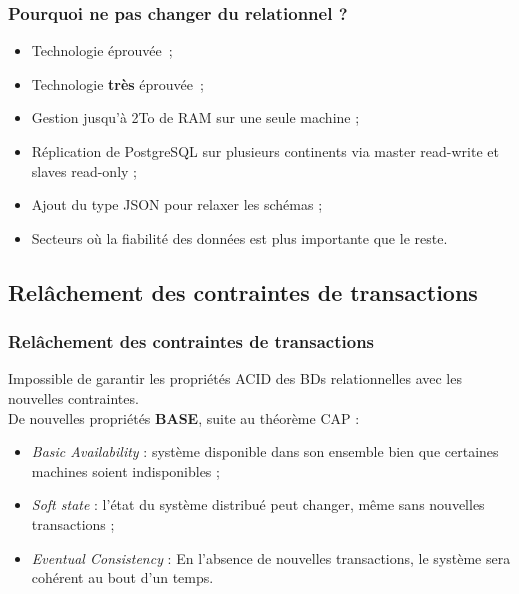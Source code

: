 	\begin{frame}
		\frametitle{Pourquoi ne pas changer du relationnel ?}

		\begin{itemize}
      \item Technologie éprouvée ;
      \item Technologie \textbf{très} éprouvée ;
    \end{itemize}

		\begin{itemize}
			\item Gestion jusqu'à 2To de RAM sur une seule machine ;
			\item Réplication de PostgreSQL sur plusieurs continents via master read-write et slaves read-only ;
			\item Ajout du type JSON pour relaxer les schémas ;
      \item Secteurs où la fiabilité des données est plus importante que le reste.
		\end{itemize}
	\end{frame}

	\subsection{Relâchement des contraintes de transactions}
	\begin{frame}
		\frametitle{Relâchement des contraintes de transactions}

		Impossible de garantir les propriétés ACID des BDs relationnelles avec les nouvelles contraintes.\\
		\vspace{10px}
		De nouvelles propriétés \textbf{BASE}, suite au théorème CAP :
		\begin{itemize}
			\item \textit{Basic Availability} : système disponible dans son ensemble bien que certaines machines soient indisponibles ;
			\item \textit{Soft state} : l'état du système distribué peut changer, même sans nouvelles transactions ;
			\item \textit{Eventual Consistency} : En l'absence de nouvelles transactions, le système sera cohérent au bout d'un temps.
		\end{itemize}

	\end{frame}

